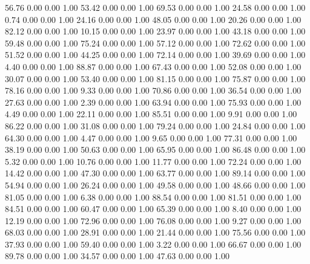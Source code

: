    56.76   0.00   0.00   1.00
   53.42   0.00   0.00   1.00
   69.53   0.00   0.00   1.00
   24.58   0.00   0.00   1.00
    0.74   0.00   0.00   1.00
   24.16   0.00   0.00   1.00
   48.05   0.00   0.00   1.00
   20.26   0.00   0.00   1.00
   82.12   0.00   0.00   1.00
   10.15   0.00   0.00   1.00
   23.97   0.00   0.00   1.00
   43.18   0.00   0.00   1.00
   59.48   0.00   0.00   1.00
   75.24   0.00   0.00   1.00
   57.12   0.00   0.00   1.00
   72.62   0.00   0.00   1.00
   51.52   0.00   0.00   1.00
   44.25   0.00   0.00   1.00
   72.14   0.00   0.00   1.00
   39.69   0.00   0.00   1.00
    4.40   0.00   0.00   1.00
   88.87   0.00   0.00   1.00
   67.43   0.00   0.00   1.00
   52.08   0.00   0.00   1.00
   30.07   0.00   0.00   1.00
   53.40   0.00   0.00   1.00
   81.15   0.00   0.00   1.00
   75.87   0.00   0.00   1.00
   78.16   0.00   0.00   1.00
    9.33   0.00   0.00   1.00
   70.86   0.00   0.00   1.00
   36.54   0.00   0.00   1.00
   27.63   0.00   0.00   1.00
    2.39   0.00   0.00   1.00
   63.94   0.00   0.00   1.00
   75.93   0.00   0.00   1.00
    4.49   0.00   0.00   1.00
   22.11   0.00   0.00   1.00
   85.51   0.00   0.00   1.00
    9.91   0.00   0.00   1.00
   86.22   0.00   0.00   1.00
   31.08   0.00   0.00   1.00
   79.24   0.00   0.00   1.00
   24.84   0.00   0.00   1.00
   64.30   0.00   0.00   1.00
    4.47   0.00   0.00   1.00
    9.65   0.00   0.00   1.00
   77.31   0.00   0.00   1.00
   38.19   0.00   0.00   1.00
   50.63   0.00   0.00   1.00
   65.95   0.00   0.00   1.00
   86.48   0.00   0.00   1.00
    5.32   0.00   0.00   1.00
   10.76   0.00   0.00   1.00
   11.77   0.00   0.00   1.00
   72.24   0.00   0.00   1.00
   14.42   0.00   0.00   1.00
   47.30   0.00   0.00   1.00
   63.77   0.00   0.00   1.00
   89.14   0.00   0.00   1.00
   54.94   0.00   0.00   1.00
   26.24   0.00   0.00   1.00
   49.58   0.00   0.00   1.00
   48.66   0.00   0.00   1.00
   81.05   0.00   0.00   1.00
    6.38   0.00   0.00   1.00
   88.54   0.00   0.00   1.00
   81.51   0.00   0.00   1.00
   84.51   0.00   0.00   1.00
   60.47   0.00   0.00   1.00
   65.39   0.00   0.00   1.00
    8.40   0.00   0.00   1.00
   12.19   0.00   0.00   1.00
   72.96   0.00   0.00   1.00
   76.08   0.00   0.00   1.00
    9.27   0.00   0.00   1.00
   68.03   0.00   0.00   1.00
   28.91   0.00   0.00   1.00
   21.44   0.00   0.00   1.00
   75.56   0.00   0.00   1.00
   37.93   0.00   0.00   1.00
   59.40   0.00   0.00   1.00
    3.22   0.00   0.00   1.00
   66.67   0.00   0.00   1.00
   89.78   0.00   0.00   1.00
   34.57   0.00   0.00   1.00
   47.63   0.00   0.00   1.00
